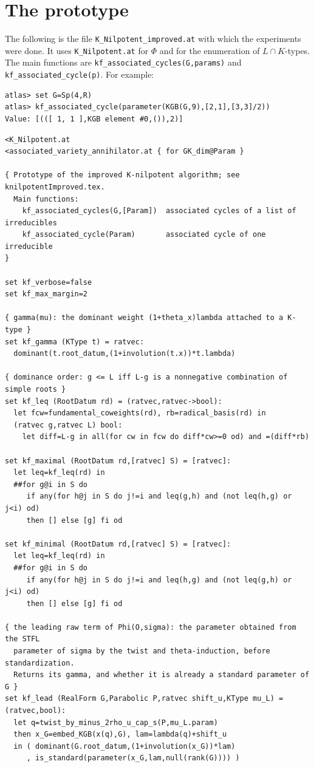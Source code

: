 \documentclass[11pt,leqno]{article}
\theoremstyle{definition}
\numberwithin{equation}{section}
\newcommand{\at}[1]{\texttt{#1}}
\begin{document}
\appendix
\section{The prototype}
\label{s:code}

The following is the file \at{K\_Nilpotent\_improved.at} with which the
experiments were done.  It uses \at{K\_Nilpotent.at} for $\Phi$ and for the
enumeration of $L\cap K$-types.  The main functions are
\at{kf\_associated\_cycles(G,params)} and \at{kf\_associated\_cycle(p)}.  For
example:
\begin{verbatim}
atlas> set G=Sp(4,R)
atlas> kf_associated_cycle(parameter(KGB(G,9),[2,1],[3,3]/2))
Value: [(([ 1, 1 ],KGB element #0,()),2)]
\end{verbatim}

{\footnotesize
\begin{verbatim}
<K_Nilpotent.at
<associated_variety_annihilator.at { for GK_dim@Param }

{ Prototype of the improved K-nilpotent algorithm; see knilpotentImproved.tex.
  Main functions:
    kf_associated_cycles(G,[Param])  associated cycles of a list of irreducibles
    kf_associated_cycle(Param)       associated cycle of one irreducible
}

set kf_verbose=false
set kf_max_margin=2

{ gamma(mu): the dominant weight (1+theta_x)lambda attached to a K-type }
set kf_gamma (KType t) = ratvec:
  dominant(t.root_datum,(1+involution(t.x))*t.lambda)

{ dominance order: g <= L iff L-g is a nonnegative combination of simple roots }
set kf_leq (RootDatum rd) = (ratvec,ratvec->bool):
  let fcw=fundamental_coweights(rd), rb=radical_basis(rd) in
  (ratvec g,ratvec L) bool:
    let diff=L-g in all(for cw in fcw do diff*cw>=0 od) and =(diff*rb)

set kf_maximal (RootDatum rd,[ratvec] S) = [ratvec]:
  let leq=kf_leq(rd) in
  ##for g@i in S do
     if any(for h@j in S do j!=i and leq(g,h) and (not leq(h,g) or j<i) od)
     then [] else [g] fi od

set kf_minimal (RootDatum rd,[ratvec] S) = [ratvec]:
  let leq=kf_leq(rd) in
  ##for g@i in S do
     if any(for h@j in S do j!=i and leq(h,g) and (not leq(g,h) or j<i) od)
     then [] else [g] fi od

{ the leading raw term of Phi(O,sigma): the parameter obtained from the STFL
  parameter of sigma by the twist and theta-induction, before standardization.
  Returns its gamma, and whether it is already a standard parameter of G }
set kf_lead (RealForm G,Parabolic P,ratvec shift_u,KType mu_L) = (ratvec,bool):
  let q=twist_by_minus_2rho_u_cap_s(P,mu_L.param)
  then x_G=embed_KGB(x(q),G), lam=lambda(q)+shift_u
  in ( dominant(G.root_datum,(1+involution(x_G))*lam)
     , is_standard(parameter(x_G,lam,null(rank(G)))) )


\end{verbatim}}
\end{document}
